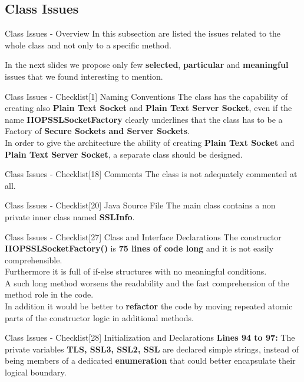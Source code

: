 \documentclass{../common/latex_classes/pdf_presentation}
\begin{document}
	\subsection{Class Issues}
	
	\begin{frame}{Class Issues - Overview}
		In this subsection are listed the issues related to the whole class and not only to a specific method. \par
		In the next slides we propose only few \textbf{selected}, \textbf{particular} and \textbf{meaningful} issues that we found interesting to mention.
	\end{frame}
	\begin{frame}{Class Issues - Checklist[1] Naming Conventions}
		The class has the capability of creating also \textbf{Plain Text Socket} and \textbf{Plain Text Server Socket}, even if the name \textbf{IIOPSSLSocketFactory} clearly underlines that the class has to be a Factory of \textbf{Secure Sockets and Server Sockets}. \\
		In order to give the architecture the ability of creating \textbf{Plain Text Socket} and \textbf{Plain Text Server Socket}, a separate class should be designed.
	\end{frame}
	\begin{frame}{Class Issues - Checklist[18] Comments}
		The class is not adequately commented at all.
	\end{frame}
	\begin{frame}{Class Issues - Checklist[20] Java Source File}
		The main class contains a non private inner class named \textbf{SSLInfo}.
	\end{frame}
	\begin{frame}{Class Issues - Checklist[27] Class and Interface Declarations}
		The constructor \textbf{IIOPSSLSocketFactory()} is \textbf{75 lines of code long} and it is not easily comprehensible.\\
		Furthermore it is full of if-else structures with no meaningful conditions.\\
		A such long method worsens the readability and the fast comprehension of the method role in the code.\\
		In addition it would be better to \textbf{refactor} the code by moving repeated atomic parts of the constructor logic in additional methods.
	\end{frame}
	\begin{frame}{Class Issues - Checklist[28] Initialization and Declarations}
		\textbf{Lines 94 to 97:} The private variables \textbf{TLS, SSL3, SSL2, SSL} are declared simple strings, instead of being members of a dedicated \textbf{enumeration} that could better encapsulate their logical boundary.
	\end{frame}
\end{document}
